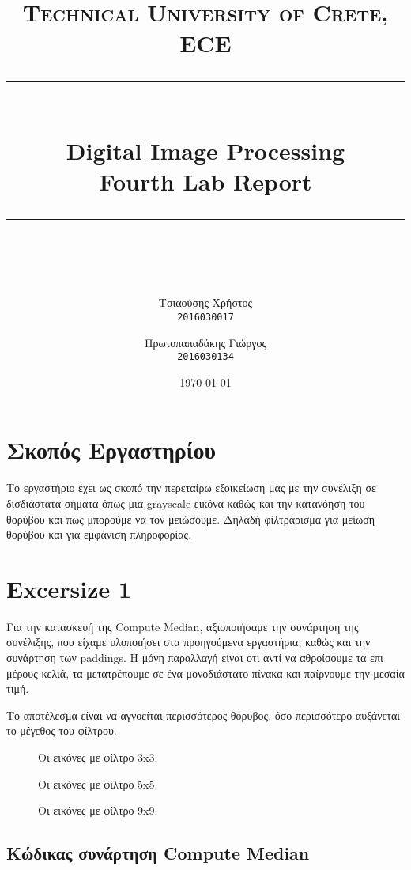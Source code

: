 \documentclass[11pt]{scrartcl} %
\title{
	\normalfont\normalsize
	\textsc{Technical University of Crete, ECE}\\ %
	\vspace{25pt} %
	\rule{\linewidth}{0.5pt}\\ %
	\vspace{20pt} %
	{\Huge Digital Image Processing}\\ %

	{\huge Fourth Lab Report}\\ %
	\vspace{12pt} %
	\rule{\linewidth}{2pt}\\ %
	\vspace{12pt} %
}
\author{\LARGE{Τσιαούσης Χρήστος}\\
		\texttt{2016030017}
		\and
		\LARGE{Πρωτοπαπαδάκης Γιώργος}\\
		\texttt{2016030134}}%
\date{\normalsize\today} %
\begin{document}
\maketitle %


\section{Σκοπός Εργαστηρίου}

Το εργαστήριο έχει ως σκοπό την περεταίρω εξοικείωση μας με την συνέλιξη σε δισδιάστατα σήματα όπως μια grayscale εικόνα καθώς και την κατανόηση του
θορύβου και πως μπορούμε να τον μειώσουμε. Δηλαδή φίλτράρισμα για μείωση θορύβου και για εμφάνιση πληροφορίας.

\section{Excersize 1}

Για την κατασκευή της Compute Median, αξιοποιήσαμε την συνάρτηση της συνέλιξης, που είχαμε υλοποιήσει στα προηγούμενα εργαστήρια, καθώς και την συνάρτηση
των paddings. Η μόνη παραλλαγή είναι οτι αντί να αθροίσουμε τα επι μέρους κελιά, τα μετατρέπουμε σε ένα μονοδιάστατο πίνακα και παίρνουμε την μεσαία τιμή.

Το αποτέλεσμα είναι να αγνοείται περισσότερος θόρυβος, όσο περισσότερο αυξάνεται το μέγεθος του φίλτρου.


\begin{figure}[h]
    \centering
    \caption{Οι εικόνες με φίλτρο 3x3.}
\end{figure}
\begin{figure}[h]
    \centering
    \caption{Οι εικόνες με φίλτρο 5x5.}
\end{figure}
\begin{figure}[h]
    \centering
    \caption{Οι εικόνες με φίλτρο 9x9.}
\end{figure}


\clearpage
\subsection*{Κώδικας συνάρτηση Compute Median}
\end{document}
